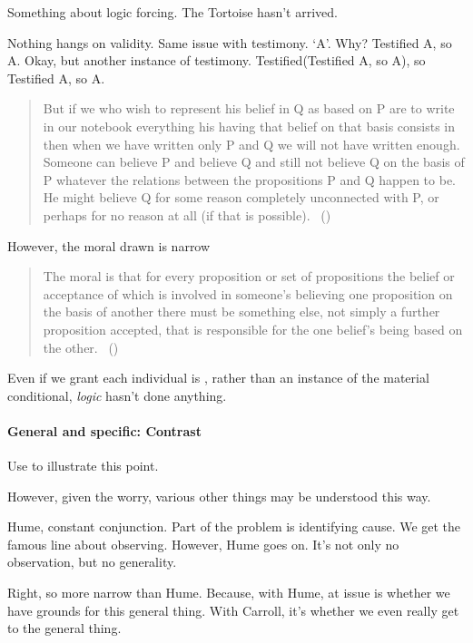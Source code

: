 \begin{note}
  \color{red}
  Something about logic forcing.
  The Tortoise hasn't arrived.

  Nothing hangs on validity.
  Same issue with testimony.
  `A'.
  Why?
  Testified A, so A.
  Okay, but another instance of testimony.
  Testified(Testified A, so A), so Testified A, so A.
\end{note}

\begin{note}
  \begin{quote}
    But if we who wish to represent his belief in Q as based on P are to write in our notebook everything his having that belief on that basis consists in then when we have written only P and Q we will not have written enough.
    Someone can believe P and believe Q and still not believe Q on the basis of P whatever the relations between the propositions P and Q happen to be.
    He might believe Q for some reason completely unconnected with P, or perhaps for no reason at all (if that is possible).%
    \mbox{ }\hfill\mbox{(\citeyear[185]{Stroud:1979aa})}
  \end{quote}
  However, the moral drawn is narrow
  \begin{quote}
    The moral is that for every proposition or set of propositions the belief or acceptance of which is involved in someone's believing one proposition on the basis of another there must be something else, not simply a further proposition accepted, that is responsible for the one belief's being based on the other.%
    \mbox{ }\hfill\mbox{(\citeyear[187]{Stroud:1979aa})}
  \end{quote}

  Even if we grant each individual is \ros{}, rather than an instance of the material conditional, \emph{logic} hasn't done anything.
\end{note}

\paragraph{General and specific: Contrast}

\begin{note}
  Use \citeauthor{Carroll:1895uj} to illustrate this point.

  However, given the worry, various other things may be understood this way.

  Hume, constant conjunction.
  Part of the problem is identifying cause.
  We get the famous line about observing.
  However, Hume goes on.
  It's not only no observation, but no generality.

  Right, so more narrow than Hume.
  Because, with Hume, at issue is whether we have grounds for this general thing.
  With Carroll, it's whether we even really get to the general thing.
\end{note}



